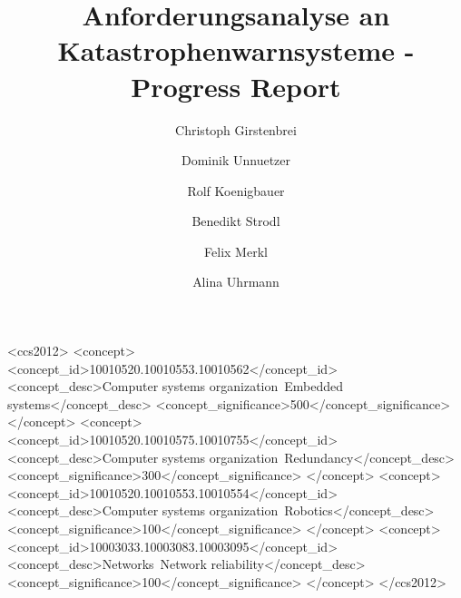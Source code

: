\documentclass[sigchi-a, authorversion]{acmart}
\begin{document}
\title{Anforderungsanalyse an Katastrophenwarnsysteme - Progress Report}

\author{Christoph Girstenbrei}

\author{Dominik Unnuetzer}

\author{Rolf Koenigbauer}

\author{Benedikt Strodl}

\author{Felix Merkl}

\author{Alina Uhrmann}

\renewcommand{\shortauthors}{C. Girstenbrei et al.}


%
%
\begin{CCSXML}
<ccs2012>
 <concept>
  <concept_id>10010520.10010553.10010562</concept_id>
  <concept_desc>Computer systems organization~Embedded systems</concept_desc>
  <concept_significance>500</concept_significance>
 </concept>
 <concept>
  <concept_id>10010520.10010575.10010755</concept_id>
  <concept_desc>Computer systems organization~Redundancy</concept_desc>
  <concept_significance>300</concept_significance>
 </concept>
 <concept>
  <concept_id>10010520.10010553.10010554</concept_id>
  <concept_desc>Computer systems organization~Robotics</concept_desc>
  <concept_significance>100</concept_significance>
 </concept>
 <concept>
  <concept_id>10003033.10003083.10003095</concept_id>
  <concept_desc>Networks~Network reliability</concept_desc>
  <concept_significance>100</concept_significance>
 </concept>
</ccs2012>  
\end{CCSXML}
\end{document}
